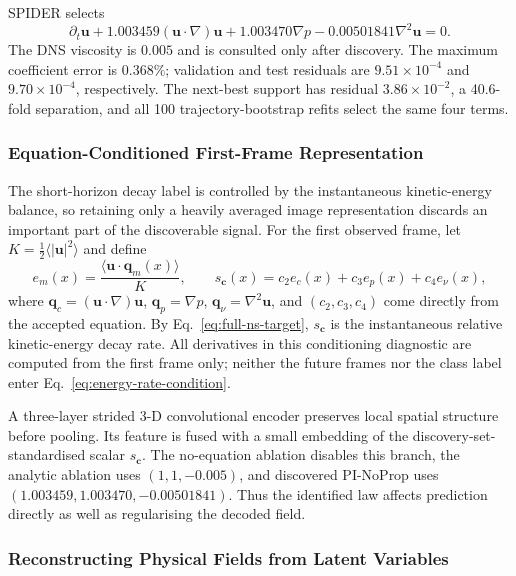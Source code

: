 \documentclass[preprint,12pt]{elsarticle}
\begin{document}
SPIDER selects
\begin{equation}
\partial_t\mathbf u
+1.003459(\mathbf u\cdot\nabla)\mathbf u
+1.003470\nabla p
-0.00501841\nabla^2\mathbf u=0.
\label{eq:discovered-full-ns}
\end{equation}
The DNS viscosity is $0.005$ and is consulted only after discovery.  The
maximum coefficient error is $0.368\%$; validation and test residuals are
$9.51\times10^{-4}$ and $9.70\times10^{-4}$, respectively.  The next-best
support has residual $3.86\times10^{-2}$, a 40.6-fold separation, and all 100
trajectory-bootstrap refits select the same four terms.

\subsubsection{Equation-Conditioned First-Frame Representation}
\label{sec:equation-condition}

The short-horizon decay label is controlled by the instantaneous kinetic-energy
balance, so retaining only a heavily averaged image representation discards an
important part of the discoverable signal.  For the first observed frame, let
$K=\frac12\langle|\mathbf u|^2\rangle$ and define
\begin{equation}
e_m(x)=\frac{\langle\mathbf u\cdot\mathbf q_m(x)\rangle}{K},\qquad
s_{\mathbf c}(x)=c_2e_c(x)+c_3e_p(x)+c_4e_\nu(x),
\label{eq:energy-rate-condition}
\end{equation}
where $\mathbf q_c=(\mathbf u\cdot\nabla)\mathbf u$,
$\mathbf q_p=\nabla p$, $\mathbf q_\nu=\nabla^2\mathbf u$, and
$(c_2,c_3,c_4)$ come directly from the accepted equation. By
Eq.~\eqref{eq:full-ns-target}, $s_{\mathbf c}$ is the instantaneous relative
kinetic-energy decay rate. All derivatives in this conditioning diagnostic are
computed from the first frame only; neither the future frames nor the class
label enter Eq.~\eqref{eq:energy-rate-condition}.

A three-layer strided 3-D convolutional encoder preserves local spatial
structure before pooling. Its feature is fused with a small embedding of the
discovery-set-standardised scalar $s_{\mathbf c}$. The no-equation ablation
disables this branch, the analytic ablation uses $(1,1,-0.005)$, and discovered
PI-NoProp uses $(1.003459,1.003470,-0.00501841)$. Thus the identified law
affects prediction directly as well as regularising the decoded field.

\subsubsection{Reconstructing Physical Fields from Latent Variables}
\label{sec:reconstructing-fields}
\end{document}
